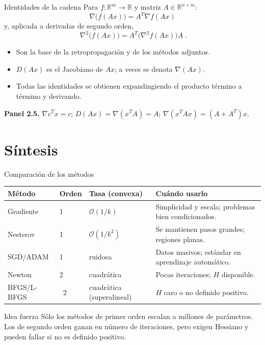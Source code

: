 \documentclass[10pt,aspectratio=169]{beamer}
\begin{document}
\begin{frame}{Identidades de la cadena}
  \small
  Para $f:\mathbb{R}^m\to\mathbb{R}$ y matriz $A\in\mathbb{R}^{n\times m}$:
  \[
    \boxed{\;\nabla\big(f(Ax)\big)=A^{T}\nabla f(Ax)\;}
  \]
  y, aplicada a derivadas de segundo orden,
  \[
    \boxed{\;\nabla^{2}\big(f(Ax)\big)
      =A^{T}\big(\nabla^{2}f(Ax)\big)A\;}.
  \]
  \begin{itemize}
    \item Son la base de la retropropagación y de los métodos adjuntos.
    \item $D(Ax)$ es el Jacobiano de $Ax$; a veces se denota $\nabla(Ax)$.
    \item Todas las identidades se obtienen expandingiendo el producto
      término a término y derivando.
  \end{itemize}
  \vfill
  {\scriptsize\color{gray}
    \textbf{Panel 2.5.} $\nabla c^{T}x=c$;\quad
    $D(Ax)=\nabla(x^{T}A)=A$;\quad
    $\nabla(x^{T}Ax)=(A+A^{T})x$.}
\end{frame}

\section{Síntesis}

\begin{frame}{Comparación de los métodos}
  \small
  \begin{tabularx}{\textwidth}{@{}l l l X@{}}
    \toprule
    Método & Orden & Tasa (convexa) & Cuándo usarlo \\
    \midrule
    Gradiente & 1 & $\mathcal{O}(1/k)$ & Simplicidad y escala; problemas bien condicionados. \\
    Nesterov & 1 & $\mathcal{O}(1/k^{2})$ & Se mantienen pasos grandes; regiones planas. \\
    SGD/ADAM & 1 & ruidosa & Datos masivos; estándar en aprendizaje automático. \\
    Newton & 2 & cuadrática & Pocas iteraciones; $H$ disponible. \\
    BFGS/L-BFGS & ~2 & cuadrática (superalineal) & $H$ caro o no definido positivo. \\
    \bottomrule
  \end{tabularx}
  \vfill
  \begin{block}{Idea fuerza}
    Sólo los métodos de primer orden escalan a millones de parámetros.
    Los de segundo orden ganan en número de iteraciones, pero exigen Hessiano
    y pueden fallar si no es definido positivo.
  \end{block}
\end{frame}
\end{document}
